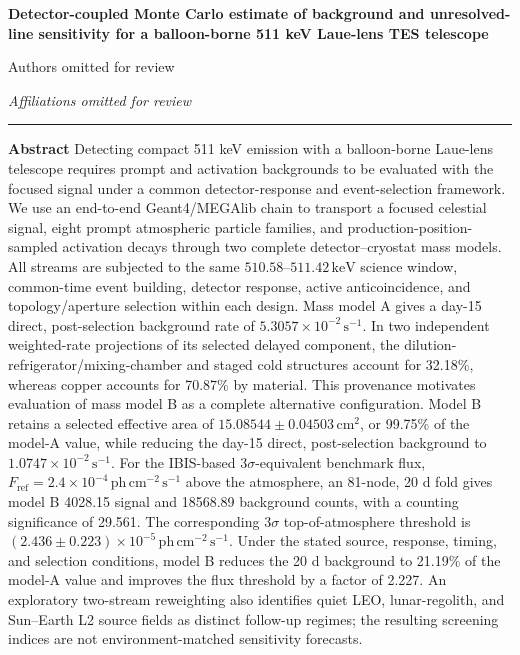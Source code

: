 \documentclass[11pt]{article}
\newcommand{\revblue}[1]{\textcolor{revisionblue}{#1}}
\newcommand{\keV}{\ensuremath{\,\mathrm{keV}}}
\newcommand{\phcms}{\ensuremath{\,\mathrm{ph\,cm^{-2}\,s^{-1}}}}
\newcommand{\cps}{\ensuremath{\,\mathrm{s^{-1}}}}
\newcommand{\fref}{F_{\mathrm{ref}}}
\begin{document}
\thispagestyle{fancy}
\begin{flushleft}
{\LARGE\bfseries Detector-coupled Monte Carlo estimate of background and unresolved-line sensitivity for a balloon-borne 511 keV Laue-lens TES telescope\par}
\vspace{1.1em}
{\large Authors omitted for review\par}
\vspace{0.3em}
{\normalsize\itshape Affiliations omitted for review\par}
\end{flushleft}
\vspace{0.7em}
\noindent\rule{\textwidth}{0.4pt}
\vspace{0.5em}

\noindent\textbf{Abstract}\hspace{0.7em}
Detecting compact 511 keV emission with a balloon-borne Laue-lens telescope
requires prompt and activation backgrounds to be evaluated with the focused
signal under a common detector-response and event-selection framework. We use
an end-to-end Geant4/MEGAlib chain to transport a focused celestial signal,
\revblue{eight prompt atmospheric particle families}, and
production-position-sampled activation decays through two complete
detector--cryostat mass models. All streams are subjected to the same
$510.58$--$511.42\keV$ science window, common-time event building, detector
response, active anticoincidence, and topology/aperture selection within each
design. Mass model A gives a day-15 direct, post-selection background rate of
$5.3057\times10^{-2}\cps$. In two independent weighted-rate projections of its
selected delayed component, the dilution-refrigerator/mixing-chamber and staged
cold structures account for 32.18\%, whereas copper accounts for 70.87\% by
material.
This provenance motivates evaluation of mass model B as a complete alternative
configuration. Model B retains a selected effective area of
$15.08544\pm0.04503\,\mathrm{cm^2}$, or 99.75\% of the model-A value, while
reducing the day-15 direct, post-selection background to $1.0747\times10^{-2}\cps$.
For the IBIS-based $3\sigma$-equivalent benchmark flux,
$\fref=2.4\times10^{-4}\phcms$ above the atmosphere, an 81-node, 20 d fold gives
model B 4028.15 signal and
18568.89 background counts, with a counting significance of 29.561. The
corresponding $3\sigma$ top-of-atmosphere threshold is
$(2.436\pm0.223)\times10^{-5}\phcms$. Under the stated source, response,
timing, and selection conditions, model B reduces the 20 d background to
21.19\% of the model-A value and improves the flux threshold by a
factor of 2.227.
An exploratory two-stream reweighting also identifies quiet LEO,
lunar-regolith, and Sun--Earth L2 source fields as distinct follow-up regimes;
the resulting screening indices are not environment-matched sensitivity
forecasts.
\end{document}
